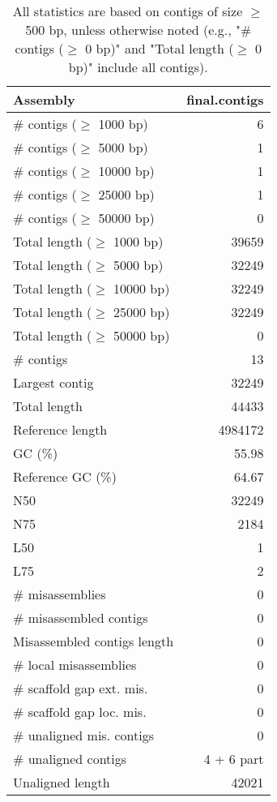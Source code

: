 \documentclass[12pt,a4paper]{article}
\begin{document}
\begin{table}[ht]
\begin{center}
\caption{All statistics are based on contigs of size $\geq$ 500 bp, unless otherwise noted (e.g., "\# contigs ($\geq$ 0 bp)" and "Total length ($\geq$ 0 bp)" include all contigs).}
\begin{tabular}{|l*{1}{|r}|}
\hline
Assembly & final.contigs \\ \hline
\# contigs ($\geq$ 1000 bp) & 6 \\ \hline
\# contigs ($\geq$ 5000 bp) & 1 \\ \hline
\# contigs ($\geq$ 10000 bp) & 1 \\ \hline
\# contigs ($\geq$ 25000 bp) & 1 \\ \hline
\# contigs ($\geq$ 50000 bp) & 0 \\ \hline
Total length ($\geq$ 1000 bp) & 39659 \\ \hline
Total length ($\geq$ 5000 bp) & 32249 \\ \hline
Total length ($\geq$ 10000 bp) & 32249 \\ \hline
Total length ($\geq$ 25000 bp) & 32249 \\ \hline
Total length ($\geq$ 50000 bp) & 0 \\ \hline
\# contigs & 13 \\ \hline
Largest contig & 32249 \\ \hline
Total length & 44433 \\ \hline
Reference length & 4984172 \\ \hline
GC (\%) & 55.98 \\ \hline
Reference GC (\%) & 64.67 \\ \hline
N50 & 32249 \\ \hline
N75 & 2184 \\ \hline
L50 & 1 \\ \hline
L75 & 2 \\ \hline
\# misassemblies & 0 \\ \hline
\# misassembled contigs & 0 \\ \hline
Misassembled contigs length & 0 \\ \hline
\# local misassemblies & 0 \\ \hline
\# scaffold gap ext. mis. & 0 \\ \hline
\# scaffold gap loc. mis. & 0 \\ \hline
\# unaligned mis. contigs & 0 \\ \hline
\# unaligned contigs & 4 + 6 part \\ \hline
Unaligned length & 42021 \\ \hline

\end{tabular}
\end{center}
\end{table}
\end{document}
